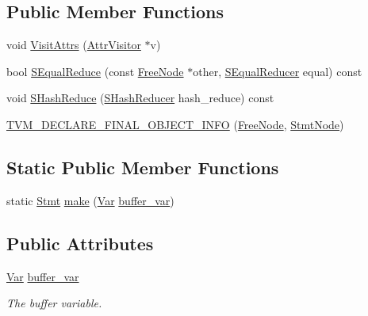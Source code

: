 \subsection*{Public Member Functions}
\begin{DoxyCompactItemize}
\item 
void \hyperlink{classtvm_1_1tir_1_1FreeNode_a00a2da1ce443524fbd78783bb734c531}{Visit\+Attrs} (\hyperlink{classtvm_1_1AttrVisitor}{Attr\+Visitor} $\ast$v)
\item 
bool \hyperlink{classtvm_1_1tir_1_1FreeNode_ab639f848247dc427bb583638045bee13}{S\+Equal\+Reduce} (const \hyperlink{classtvm_1_1tir_1_1FreeNode}{Free\+Node} $\ast$other, \hyperlink{classtvm_1_1SEqualReducer}{S\+Equal\+Reducer} equal) const 
\item 
void \hyperlink{classtvm_1_1tir_1_1FreeNode_abdb3cd72a7d4c41dc45e4cf25a9f2d45}{S\+Hash\+Reduce} (\hyperlink{classtvm_1_1SHashReducer}{S\+Hash\+Reducer} hash\+\_\+reduce) const 
\item 
\hyperlink{classtvm_1_1tir_1_1FreeNode_a3578cc8d461c7c99c972e317ce2fff08}{T\+V\+M\+\_\+\+D\+E\+C\+L\+A\+R\+E\+\_\+\+F\+I\+N\+A\+L\+\_\+\+O\+B\+J\+E\+C\+T\+\_\+\+I\+N\+FO} (\hyperlink{classtvm_1_1tir_1_1FreeNode}{Free\+Node}, \hyperlink{classtvm_1_1tir_1_1StmtNode}{Stmt\+Node})
\end{DoxyCompactItemize}
\subsection*{Static Public Member Functions}
\begin{DoxyCompactItemize}
\item 
static \hyperlink{classtvm_1_1tir_1_1Stmt}{Stmt} \hyperlink{classtvm_1_1tir_1_1FreeNode_accc4df2ca7c3d278947c47611ffe663c}{make} (\hyperlink{classtvm_1_1tir_1_1Var}{Var} \hyperlink{classtvm_1_1tir_1_1FreeNode_aa7b2c65857d55fb7da6a1fa4935b48fe}{buffer\+\_\+var})
\end{DoxyCompactItemize}
\subsection*{Public Attributes}
\begin{DoxyCompactItemize}
\item 
\hyperlink{classtvm_1_1tir_1_1Var}{Var} \hyperlink{classtvm_1_1tir_1_1FreeNode_aa7b2c65857d55fb7da6a1fa4935b48fe}{buffer\+\_\+var}
\begin{DoxyCompactList}\small\item\em The buffer variable. \end{DoxyCompactList}\end{DoxyCompactItemize}
